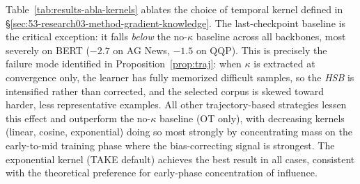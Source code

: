 \begin{foldable} %
  Table~\ref{tab:results-abla-kernels} ablates the choice of temporal kernel defined in \S\ref{sec:53-research03-method-gradient-knowledge}.
  The last-checkpoint baseline is the critical exception: it falls \textit{below} the no-$\kappa$ baseline across all backbones, most severely on BERT ($-2.7$ on AG News, $-1.5$ on QQP).
  This is precisely the failure mode identified in Proposition~\ref{prop:traj}: when $\kappa$ is extracted at convergence only, the learner has fully memorized difficult samples, so the \textit{\acl{HSB}} is intensified rather than corrected, and the selected corpus is skewed toward harder, less representative examples.
  All other trajectory-based strategies lessen this effect and outperform the no-$\kappa$ baseline (OT only), with decreasing kernels (linear, cosine, exponential) doing so most strongly by concentrating mass on the early-to-mid training phase where the bias-correcting signal is strongest.
  The exponential kernel (TAKE default) achieves the best result in all cases, consistent with the theoretical preference for early-phase concentration of influence.
\end{foldable}